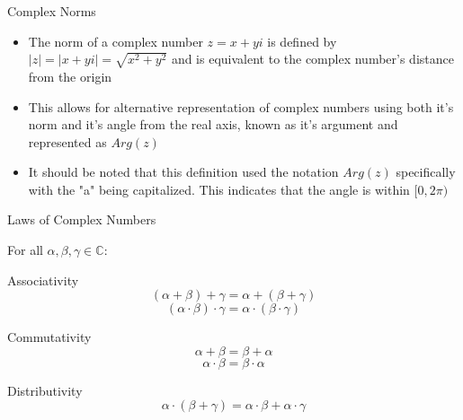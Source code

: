 \begin{frame}{Complex Norms}
\begin{itemize}
     \item<1-> The norm of a complex number $z = x + yi$ is defined by $|z| = |x + yi| = \sqrt{x^2 + y^2}$ and is equivalent to the complex number's distance from the origin    
     \item<2-> This allows for alternative representation of complex numbers using both it's norm and it's angle from the real axis, known as it's argument and represented as $Arg(z)$
     \item<3-> It should be noted that this definition used the notation $Arg(z)$ specifically with the "a" being capitalized. This indicates that the angle is within $[0, 2\pi)$
\end{itemize}

\end{frame}

\begin{frame}{Laws of Complex Numbers}

For all $\alpha, \beta, \gamma \in \mathbb{C}$:
\begin{block}{Associativity}
$$(\alpha+\beta)+\gamma=\alpha+(\beta+\gamma)$$
$$(\alpha\cdot\beta)\cdot\gamma=\alpha\cdot(\beta\cdot\gamma)$$
\end{block}

\begin{block}{Commutativity}
$$\alpha+\beta=\beta+\alpha$$
$$\alpha\cdot\beta=\beta\cdot\alpha$$
\end{block}

\begin{block}{Distributivity}
$$\alpha\cdot(\beta+\gamma)=\alpha\cdot\beta+\alpha\cdot\gamma$$
\end{block}
    
\end{frame}


